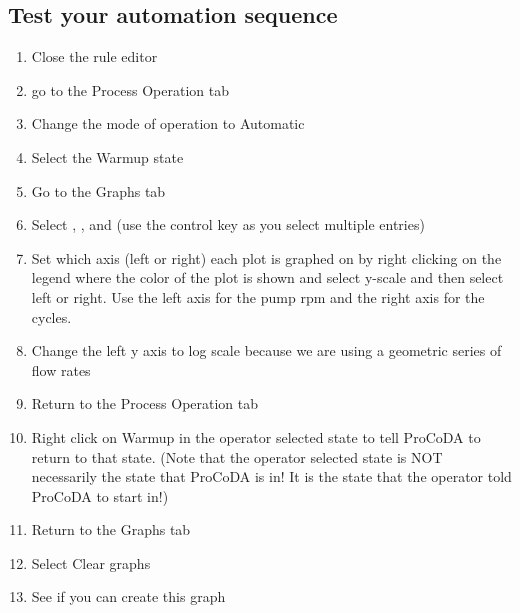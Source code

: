 \documentclass[letterpaper,10pt,english]{sphinxmanual}
\begin{document}
\subsection{Test your automation sequence}
\label{\detokenize{ProCoDA/ProCoDA:test-your-automation-sequence}}\begin{enumerate}
\item {} 
Close the rule editor

\item {} 
go to the Process Operation tab

\item {} 
Change the mode of operation to Automatic

\item {} 
Select the Warmup state

\item {} 
Go to the Graphs tab

\item {} 
Select , , and  (use the control key as you select multiple entries)

\item {} 
Set which axis (left or right) each plot is graphed on by right clicking on the legend where the color of the plot is shown and select y-scale and then select left or right. Use the left axis for the pump rpm and the right axis for the cycles.

\item {} 
Change the left y axis to log scale  because we are using a geometric series of flow rates

\item {} 
Return to the Process Operation tab

\item {} 
Right click on Warmup in the operator selected state to tell ProCoDA to return to that state. (Note that the operator selected state is NOT necessarily the state that ProCoDA is in! It is the state that the operator told ProCoDA to start in!)

\item {} 
Return to the Graphs tab

\item {} 
Select Clear graphs

\item {} 
See if you can create this graph 

\end{enumerate}
\end{document}
